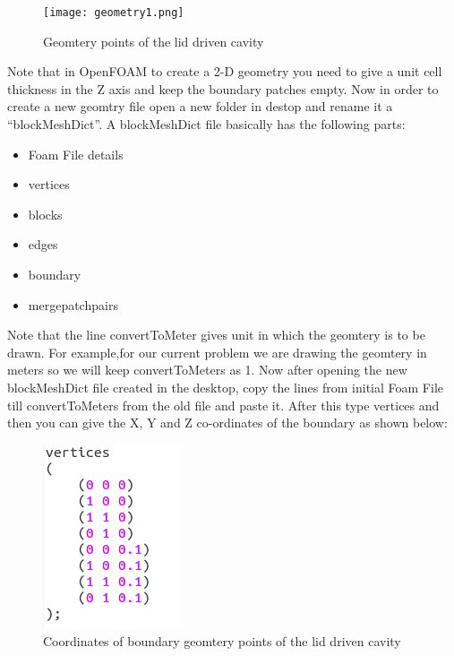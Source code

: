 \documentclass[a4paper,12pt]{report}
\begin{document}
\begin{figure}[ht]  
\begin{center}  
\texttt{[image: geometry1.png]}
\caption{Geomtery points of the lid driven cavity}
\label{geometry}
\end{center}  
\end{figure}
 
\flushleft Note that in OpenFOAM to create a 2-D geometry you need to give a unit cell thickness in the Z axis and keep the boundary patches empty. Now in order to create a new geomtry file open a new folder in destop and rename it a “blockMeshDict”.  
\flushleft A blockMeshDict file basically has the following parts$:$

\begin{itemize}
\item Foam File details
\item vertices
\item blocks
\item edges
\item boundary
\item mergepatchpairs
\end{itemize}

\flushleft Note that the line convertToMeter gives unit in which the geomtery is to be drawn. For example,for our current problem we are drawing the geomtery in meters so we will keep convertToMeters as 1. Now after opening the new blockMeshDict file created in the desktop, copy the lines from initial Foam File till convertToMeters from the old file and paste it. After this type vertices and then you can give the X, Y and Z co-ordinates of the boundary as shown below$:$

\begin{figure}[ht]  
\begin{center}  
\includegraphics[scale=0.66]{vertices.png}
\caption{Coordinates of boundary geomtery points of the lid driven cavity}
\label{vertices}
\end{center}  
\end{figure}
\end{document}
